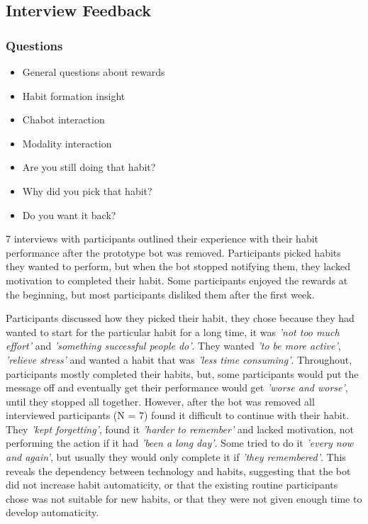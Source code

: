 \subsection{Interview Feedback}

\subsubsection*{Questions}

\begin{itemize}
  \item General questions about rewards
  \item Habit formation insight
  \item Chabot interaction
  \item Modality interaction
  \item Are you still doing that habit?
  \item Why did you pick that habit?
  \item Do you want it back?
\end{itemize}


7 interviews with participants outlined their experience with their habit performance after the prototype bot was removed. Participants picked habits they wanted to perform, but when the bot stopped notifying them, they lacked motivation to completed their habit. Some participants enjoyed the rewards at the beginning, but most participants disliked them after the first week.

Participants discussed how they picked their habit, they chose because they had wanted to start for the particular habit for a long time, it was \textit{'not too much effort'} and \textit{'something successful people do'}. They wanted \textit{'to be more active'}, \textit{'relieve stress'} and wanted a habit that was \textit{'less time consuming'}. Throughout, participants mostly completed their habits, but, some participants would put the message off and eventually get their performance would get \textit{'worse and worse'}, until they stopped all together. However, after the bot was removed all interviewed participants (N = 7) found it difficult to continue with their habit. They \textit{'kept forgetting'}, found it \textit{'harder to remember'} and lacked motivation, not performing the action if it had \textit{'been a long day'}. Some tried to do it \textit{'every now and again'}, but usually they would only complete it if \textit{'they remembered'}. This reveals the dependency between technology and habits, suggesting that the bot did not increase habit automaticity, or that the existing routine participants chose was not suitable for new habits, or that they were not given enough time to develop automaticity.


